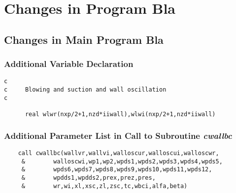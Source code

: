 \chapter{Changes in Program Bla}\label{app:bla_change}
\section{Changes in Main Program Bla}
\subsection*{Additional Variable Declaration}
\begin{verbatim}
c
c     Blowing and suction and wall oscillation
c
      
      real wlwr(nxp/2+1,nzd*iiwall),wlwi(nxp/2+1,nzd*iiwall)

\end{verbatim}

\subsection*{Additional Parameter List in Call to Subroutine \emph{cwallbc}}
\begin{verbatim}
    call cwallbc(wallvr,wallvi,walloscur,walloscui,walloscwr,
     &        walloscwi,wp1,wp2,wpds1,wpds2,wpds3,wpds4,wpds5,        
     &        wpds6,wpds7,wpds8,wpds9,wpds10,wpds11,wpds12,
     &        wpdds1,wpdds2,prex,prez,pres,
     &        wr,wi,xl,xsc,zl,zsc,tc,wbci,alfa,beta)
\end{verbatim}

